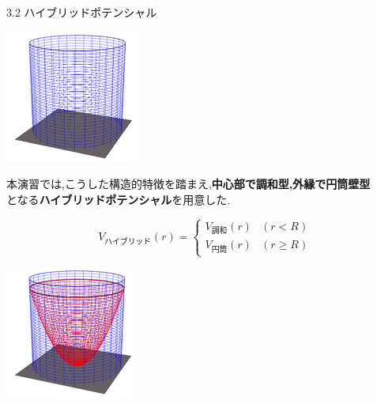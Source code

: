 \documentclass{beamer}
\begin{document}
\begin{frame}{3.2 ハイブリッドポテンシャル}
\begin{minipage}{0.28\textwidth}
  \includegraphics[width=0.8\linewidth]{images/円筒.png} \\
  \end{minipage}
  
  本演習では,こうした構造的特徴を踏まえ,\textbf{中心部で調和型,外縁で円筒壁型}\\
  となる\textbf{ハイブリッドポテンシャル}を用意した.
    \vspace{-1.0em}
  \begin{minipage}{0.7\textwidth}
  \begin{equation}
  V_{ハイブリッド}(r) =
  \begin{cases}
  V_{調和}(r) & (r < R) \\
  V_{円筒}(r) & (r \geq R)
  \end{cases}
  \end{equation}
  \end{minipage}
  \hfill
  \begin{minipage}{0.28\textwidth}
  \includegraphics[width=0.8\linewidth]{images/ハイブリッド.png} \\
  \end{minipage}
  
  \end{frame}
\end{document}
